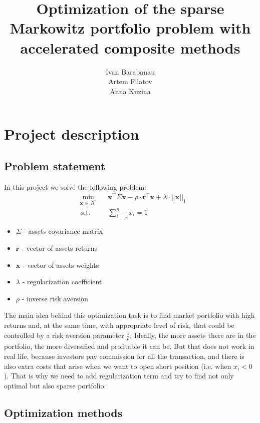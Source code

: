 \documentclass[a4paper]{article}
\title{Optimization of the sparse Markowitz portfolio problem with accelerated composite methods}
\author{Ivan Barabanau\\Artem Filatov\\Anna Kuzina}
\begin{document}
\maketitle


\section{Project description}
\subsection{Problem statement}
In this project we solve the following problem:
\begin{equation*}
\begin{aligned}
& \underset{\mathbf{x}\,\in\,R^n}{\min}
& & \mathbf{x}^\top\Sigma \mathbf{x} - \rho\cdot\mathbf{r}^\top \mathbf{x} + \lambda \cdot||\mathbf{x}||_{1} \\
& \,\text{s.t.}
& & \sum\limits_{i=1}^{n}x_i = 1
\end{aligned}
\end{equation*}

\begin{itemize}
\item $\Sigma$ - assets covariance matrix
\item $\mathbf{r}$ - vector of assets returns
\item $\mathbf{x}$ - vector of assets weights
\item $\lambda$ - regularization coefficient
\item $\rho$ - inverse risk aversion
\end{itemize}
The main idea behind this optimization task is to find market portfolio with high returns and, at the same time, with appropriate level of risk, that could be controlled by a risk aversion parameter $\frac{1}{\rho}$. Ideally, the more assets there are in the portfolio, the more diversified and profitable it can be. But that does not work in real life, because investors pay commission for all the transaction, and there is also extra costs that arise when we want to open short position (i.e. when $x_i < 0$). That is why we need to add regularization term and try to find not only optimal but also sparse portfolio.

\subsection{Optimization methods}
\end{document}
